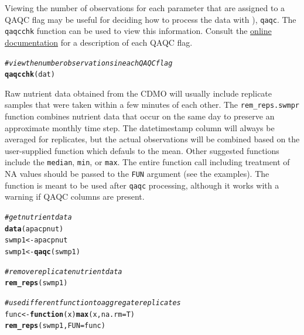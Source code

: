 \documentclass[10pt,letterpaper]{article}\usepackage[]{graphicx}\usepackage[]{color}
\makeatletter
\newcommand{\hlcom}[1]{\textcolor[rgb]{0.678,0.584,0.686}{\textit{#1}}}%
\newcommand{\hlstd}[1]{\textcolor[rgb]{0.345,0.345,0.345}{#1}}%
\newcommand{\hlkwa}[1]{\textcolor[rgb]{0.161,0.373,0.58}{\textbf{#1}}}%
\newcommand{\hlkwb}[1]{\textcolor[rgb]{0.69,0.353,0.396}{#1}}%
\newcommand{\hlkwc}[1]{\textcolor[rgb]{0.333,0.667,0.333}{#1}}%
\newcommand{\hlkwd}[1]{\textcolor[rgb]{0.737,0.353,0.396}{\textbf{#1}}}%
\newenvironment{kframe}{%
 \def\at@end@of@kframe{}%
 \ifinner\ifhmode%
  \def\at@end@of@kframe{\end{minipage}}%
  \begin{minipage}{\columnwidth}%
 \fi\fi%
 \def\FrameCommand##1{\hskip\@totalleftmargin \hskip-\fboxsep
 \colorbox{shadecolor}{##1}\hskip-\fboxsep
     \hskip-\linewidth \hskip-\@totalleftmargin \hskip\columnwidth}%
 \MakeFramed {\advance\hsize-\width
   \@totalleftmargin\z@ \linewidth\hsize
   \@setminipage}}%
 {\par\unskip\endMakeFramed%
 \at@end@of@kframe}
\newenvironment{knitrout}{}{} %
\makeatother
\begin{document}
Viewing the number of observations for each parameter that are assigned to a QAQC flag may be useful for deciding how to process the data with ), \texttt{qaqc}.  The \texttt{qaqcchk} function can be used to view this information.  Consult the \href{http://cdmo.baruch.sc.edu/data/qaqc.cfm}{online documentation} for a description of each QAQC flag. 

\begin{knitrout}
\color{fgcolor}\begin{kframe}
\begin{alltt}
\hlcom{# view the number observations in each QAQC flag}
\hlkwd{qaqcchk}\hlstd{(dat)}
\end{alltt}
\end{kframe}
\end{knitrout}

Raw nutrient data obtained from the CDMO will usually include replicate samples that were taken within a few minutes of each other.  The \texttt{rem\_reps.swmpr} function combines nutrient data that occur on the same day to preserve an approximate monthly time step.  The datetimestamp column will always be averaged for replicates, but the actual observations will be combined based on the user-supplied function which defauls to the mean.  Other suggested functions include the \texttt{median}, \texttt{min}, or \texttt{max}.  The entire function call including treatment of NA values should be passed to the \texttt{FUN} argument (see the examples).  The function is meant to be used after \texttt{qaqc} processing, although it works with a warning if QAQC columns are present.

\begin{knitrout}
\color{fgcolor}\begin{kframe}
\begin{alltt}
\hlcom{# get nutrient data}
\hlkwd{data}\hlstd{(apacpnut)}
\hlstd{swmp1} \hlkwb{<-} \hlstd{apacpnut}
\hlstd{swmp1} \hlkwb{<-} \hlkwd{qaqc}\hlstd{(swmp1)}

\hlcom{# remove replicate nutrient data}
\hlkwd{rem_reps}\hlstd{(swmp1)}

\hlcom{# use different function to aggregate replicates}
\hlstd{func} \hlkwb{<-} \hlkwa{function}\hlstd{(}\hlkwc{x}\hlstd{)} \hlkwd{max}\hlstd{(x,} \hlkwc{na.rm} \hlstd{= T)}
\hlkwd{rem_reps}\hlstd{(swmp1,} \hlkwc{FUN} \hlstd{= func)}
\end{alltt}
\end{kframe}
\end{knitrout}
\end{document}
